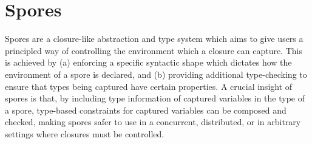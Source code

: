 \documentclass{easychair}
\begin{document}
\appendix

\vspace{1mm}
\section{Spores}
\label{sec:spores}




Spores are a closure-like abstraction and type system which aims to give users
a principled way of controlling the environment which a closure can capture.
This is achieved by (a) enforcing a specific syntactic shape which dictates
how the environment of a spore is declared, and (b) providing additional type-checking
to ensure that types being captured have certain properties. A crucial insight of
spores is that, by including type information of captured
variables in the type of a spore, type-based constraints for captured
variables can be composed and checked, making spores safer to use in a
concurrent, distributed, or in arbitrary settings where closures must be
controlled.
\end{document}
